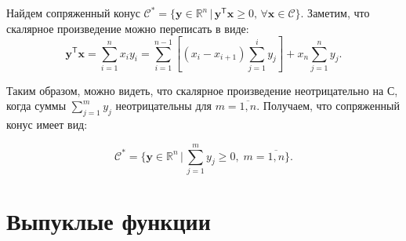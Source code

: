 \documentclass[a4paper,12pt]{article}
\begin{document}
\begin{enumerate}
		Найдем сопряженный конус $\mathcal{C}^* = \{ \mathbf{y} \in \mathbb{R}^n \,|\, \mathbf{y}^\mathsf{T} \mathbf{x} \geqslant 0,\, \forall \mathbf{x} \in \mathcal{C} \}$. Заметим, что скалярное произведение можно переписать в виде:
		 \begin{equation*}
		 	\mathbf{y}^\mathsf{T} \mathbf{x} = \sum_{i=1}^n x_i y_i = \sum_{i=1}^{n-1} \left[(x_i-x_{i+1}) \sum_{j=1}^{i} y_j \right] + x_n \sum_{j=1}^{n} y_j.
		 \end{equation*}
		 
		Таким образом, можно видеть, что скалярное произведение неотрицательно на $\mathcal{С}$, когда суммы  $\sum_{j=1}^{m} y_j$ неотрицательны для $m=\overline{1, n}$. Получаем, что сопряженный конус имеет вид: 
		
		\begin{equation*}
			\mathcal{C}^* = \biggl\{ \mathbf{y} \in \mathbb{R}^n \,|\, \sum_{j=1}^{m} y_j \geqslant 0,\; m=\overline{1, n} \biggr\}.
		\end{equation*}
		
	\end{enumerate}
	
	\newpage
	\section{Выпуклые функции}
	
\end{document}
